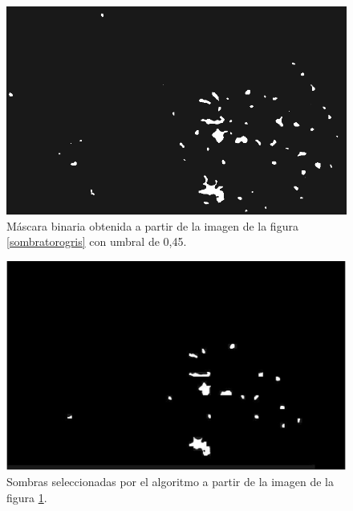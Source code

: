 \begin{figure}[h!]
    \includegraphics[width=\textwidth]{Imagenes/Homomorfico/ST2_bin.png}
     \hfill
     \caption{Máscara binaria obtenida a partir de la imagen de la figura \ref{sombratorogris} con umbral de 0,45.}
    \label{mascaraST}
\end{figure}

\begin{figure}[h!]
    \includegraphics[width=\textwidth]{Imagenes/Homomorfico/ST2_masked.png}
     \hfill
     \caption{Sombras seleccionadas por el algoritmo a partir de la imagen de la figura \ref{mascaraST}.}
    \label{seleccionadaST}
\end{figure}

